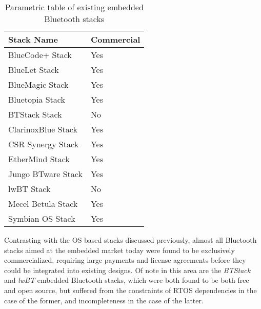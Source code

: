 \begin{table}[H]
	\begin{center}
		\begin{tabular}{ | l | l |}
			\hline
			\textbf{Stack Name}	& \textbf{Commercial} \\ \hline

			BlueCode+ Stack		& Yes	\\ \hline
			BlueLet Stack		& Yes	\\ \hline
			BlueMagic Stack		& Yes	\\ \hline
			Bluetopia Stack		& Yes	\\ \hline
			BTStack Stack		& No	\\ \hline
			ClarinoxBlue Stack	& Yes	\\ \hline
			CSR Synergy Stack	& Yes	\\ \hline
			EtherMind Stack		& Yes	\\ \hline
			Jungo BTware Stack	& Yes	\\ \hline
			lwBT Stack			& No	\\ \hline
			Mecel Betula Stack	& Yes	\\ \hline
			Symbian OS Stack	& Yes	\\ \hline
		\end{tabular}
		\caption[Existing Embedded Bluetooth Stacks]{Parametric table of existing embedded Bluetooth stacks}
		\label{tab:embbtstacks}
	\end{center}
\end{table}


Contrasting with the OS based stacks discussed previously, almost all Bluetooth stacks aimed at the embedded market today were found to be exclusively commercialized, requiring large payments and license agreements before they could be integrated into existing designs. Of note in this area are the \textit{BTStack} and \textit{lwBT} embedded Bluetooth stacks, which were both found to be both free and open source, but suffered from the constraints of RTOS dependencies in the case of the former, and incompleteness in the case of the latter.

